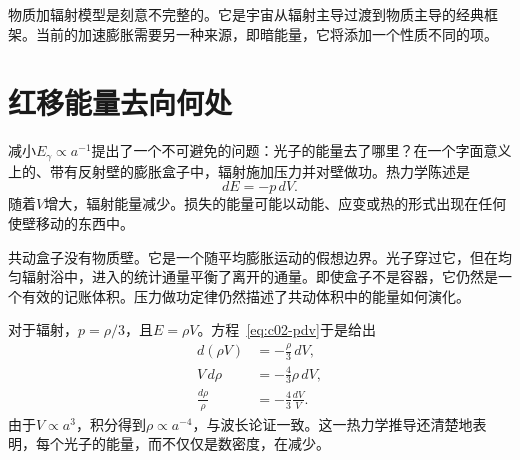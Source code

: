 \begin{classroomqa}
\end{classroomqa}

物质加辐射模型是刻意不完整的。它是宇宙从辐射主导过渡到物质主导的经典框架。当前的加速膨胀需要另一种来源，即暗能量，它将添加一个性质不同的项。

\section{红移能量去向何处}

减小\(E_\gamma\propto a^{-1}\)提出了一个不可避免的问题：光子的能量去了哪里？在一个字面意义上的、带有反射壁的膨胀盒子中，辐射施加压力并对壁做功。热力学陈述是
\begin{equation}
dE=-p\,dV.
\label{eq:c02-pdv}
\end{equation}
随着\(V\)增大，辐射能量减少。损失的能量可能以动能、应变或热的形式出现在任何使壁移动的东西中。

共动盒子没有物质壁。它是一个随平均膨胀运动的假想边界。光子穿过它，但在均匀辐射浴中，进入的统计通量平衡了离开的通量。即使盒子不是容器，它仍然是一个有效的记账体积。压力做功定律仍然描述了共动体积中的能量如何演化。

对于辐射，\(p=\rho/3\)，且\(E=\rho V\)。方程~\eqref{eq:c02-pdv}于是给出
\begin{align}
d(\rho V)&=-\frac{\rho}{3}\,dV,\\
V\,d\rho&=-\frac{4}{3}\rho\,dV,\\
\frac{d\rho}{\rho}&=-\frac{4}{3}\frac{dV}{V}.
\end{align}
由于\(V\propto a^3\)，积分得到\(\rho\propto a^{-4}\)，与波长论证一致。这一热力学推导还清楚地表明，每个光子的能量，而不仅仅是数密度，在减少。

\begin{classroomqa}
\end{classroomqa}

